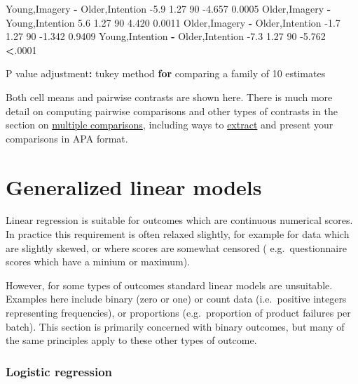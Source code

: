 \documentclass[]{article}
\newenvironment{Shaded}{\begin{snugshade}}{\end{snugshade}}
\newcommand{\ControlFlowTok}[1]{\textcolor[rgb]{0.13,0.29,0.53}{\textbf{#1}}}
\newcommand{\DecValTok}[1]{\textcolor[rgb]{0.00,0.00,0.81}{#1}}
\newcommand{\FloatTok}[1]{\textcolor[rgb]{0.00,0.00,0.81}{#1}}
\newcommand{\NormalTok}[1]{#1}
\newcommand{\OperatorTok}[1]{\textcolor[rgb]{0.81,0.36,0.00}{\textbf{#1}}}
\newcommand{\StringTok}[1]{\textcolor[rgb]{0.31,0.60,0.02}{#1}}
\begin{document}
\begin{Shaded}
\begin{Highlighting}[]
\NormalTok{ Young,Imagery }\OperatorTok{-}\StringTok{ }\NormalTok{Older,Intention       }\FloatTok{-5.9} \FloatTok{1.27} \DecValTok{90}  \FloatTok{-4.657} \FloatTok{0.0005} 
\NormalTok{ Older,Imagery }\OperatorTok{-}\StringTok{ }\NormalTok{Young,Intention        }\FloatTok{5.6} \FloatTok{1.27} \DecValTok{90}   \FloatTok{4.420} \FloatTok{0.0011} 
\NormalTok{ Older,Imagery }\OperatorTok{-}\StringTok{ }\NormalTok{Older,Intention       }\FloatTok{-1.7} \FloatTok{1.27} \DecValTok{90}  \FloatTok{-1.342} \FloatTok{0.9409} 
\NormalTok{ Young,Intention }\OperatorTok{-}\StringTok{ }\NormalTok{Older,Intention     }\FloatTok{-7.3} \FloatTok{1.27} \DecValTok{90}  \FloatTok{-5.762} \OperatorTok{<}\NormalTok{.}\DecValTok{0001} 

\NormalTok{P value adjustment}\OperatorTok{:}\StringTok{ }\NormalTok{tukey method }\ControlFlowTok{for}\NormalTok{ comparing a family of }\DecValTok{10}\NormalTok{ estimates }
\end{Highlighting}
\end{Shaded}

Both cell means and pairwise contrasts are shown here. There is much more detail
on computing pairwise comparisons and other types of contrasts in the section on
\protect\hyperlink{multiple-comparisons}{multiple comparisons}, including ways to
\protect\hyperlink{extract-contrasts}{extract} and present your comparisons in APA format.

\hypertarget{generalized-linear-models}{%
\section{Generalized linear models}\label{generalized-linear-models}}

Linear regression is suitable for outcomes which are continuous numerical
scores. In practice this requirement is often relaxed slightly, for example for
data which are slightly skewed, or where scores are somewhat censored (
e.g.~questionnaire scores which have a minium or maximum).

However, for some types of outcomes standard linear models are unsuitable.
Examples here include binary (zero or one) or count data (i.e.~positive integers
representing frequencies), or proportions (e.g.~proportion of product failures
per batch). This section is primarily concerned with binary outcomes, but many
of the same principles apply to these other types of outcome.

\hypertarget{logistic-regression}{%
\subsubsection*{Logistic regression}\label{logistic-regression}}
\end{document}
